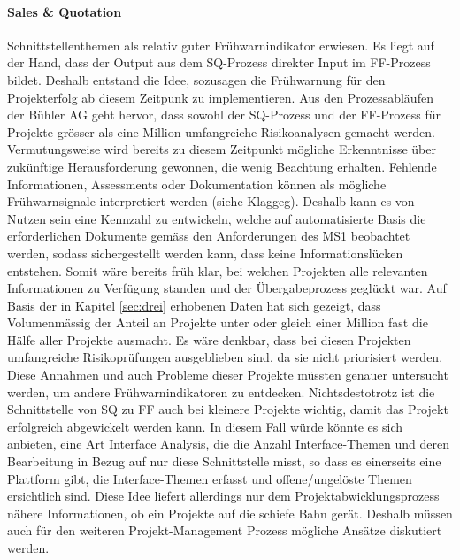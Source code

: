 \paragraph{Sales \& Quotation} Schnittstellenthemen als relativ guter Frühwarnindikator erwiesen. Es liegt auf der Hand, dass der Output aus dem SQ-Prozess direkter Input im FF-Prozess bildet. Deshalb entstand die Idee, sozusagen die Frühwarnung für den Projekterfolg ab diesem Zeitpunk zu implementieren. Aus den Prozessabläufen der Bühler AG geht hervor, dass sowohl der SQ-Prozess und der FF-Prozess für Projekte grösser als eine Million umfangreiche Risikoanalysen gemacht werden. Vermutungsweise wird bereits zu diesem Zeitpunkt mögliche Erkenntnisse über zukünftige Herausforderung gewonnen, die wenig Beachtung erhalten. Fehlende Informationen, Assessments oder Dokumentation können als mögliche Frühwarnsignale interpretiert werden (siehe Klaggeg). Deshalb kann es von Nutzen sein eine Kennzahl zu entwickeln, welche auf automatisierte Basis die erforderlichen Dokumente gemäss den Anforderungen des MS1 beobachtet werden, sodass sichergestellt werden kann, dass keine Informationslücken entstehen. Somit wäre bereits früh klar, bei welchen Projekten alle relevanten Informationen zu Verfügung standen und der Übergabeprozess geglückt war. Auf Basis der in Kapitel \ref{sec:drei} erhobenen Daten hat sich gezeigt, dass Volumenmässig der Anteil an Projekte unter oder gleich einer Million fast die Hälfe aller Projekte ausmacht. Es wäre denkbar, dass bei diesen Projekten umfangreiche Risikoprüfungen ausgeblieben sind, da sie nicht priorisiert werden. Diese Annahmen und auch Probleme dieser Projekte müssten genauer untersucht werden, um andere Frühwarnindikatoren zu entdecken. Nichtsdestotrotz ist die Schnittstelle von SQ zu FF auch bei kleinere Projekte wichtig, damit das Projekt erfolgreich abgewickelt werden kann. In diesem Fall würde könnte es sich anbieten, eine Art Interface Analysis, die die Anzahl Interface-Themen und deren Bearbeitung in Bezug auf nur diese Schnittstelle misst, so dass es einerseits eine Plattform gibt, die Interface-Themen erfasst und offene/ungelöste Themen ersichtlich sind. Diese Idee liefert allerdings nur dem Projektabwicklungsprozess nähere Informationen, ob ein Projekte auf die schiefe Bahn gerät. Deshalb müssen auch für den weiteren Projekt-Management Prozess mögliche Ansätze diskutiert werden.
